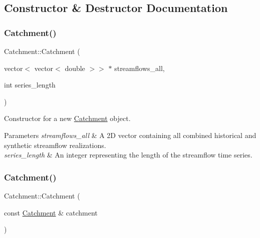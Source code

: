\subsection{Constructor \& Destructor Documentation}
\mbox{\label{classCatchment_aafdee6ee868a8892314672abb119e60f}} 
\subsubsection{\texorpdfstring{Catchment()}{Catchment()}\hspace{0.1cm}{\footnotesize\ttfamily [1/2]}}
{\footnotesize\ttfamily Catchment\+::\+Catchment (\begin{DoxyParamCaption}\item[{vector$<$ vector$<$ double $>$$>$ $\ast$}]{streamflows\+\_\+all,  }\item[{int}]{series\+\_\+length }\end{DoxyParamCaption})}



Constructor for a new \mbox{\hyperlink{classCatchment}{Catchment}} object. 


\begin{DoxyParams}{Parameters}
{\em streamflows\+\_\+all} & A 2D vector containing all combined historical and synthetic streamflow realizations. \\
\hline
{\em series\+\_\+length} & An integer representing the length of the streamflow time series. \\
\hline
\end{DoxyParams}
\mbox{\label{classCatchment_ae311c4b2d857a8b5abc01f5317b04df2}} 
\subsubsection{\texorpdfstring{Catchment()}{Catchment()}\hspace{0.1cm}{\footnotesize\ttfamily [2/2]}}
{\footnotesize\ttfamily Catchment\+::\+Catchment (\begin{DoxyParamCaption}\item[{const \mbox{\hyperlink{classCatchment}{Catchment}} \&}]{catchment }\end{DoxyParamCaption})}



